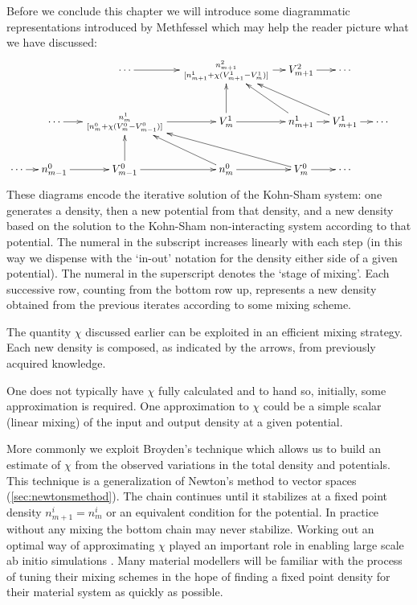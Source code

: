 Before we conclude this chapter we will introduce some diagrammatic representations introduced
by Methfessel which may help the reader picture what we have discussed\cite{methfessel95}:
%
\begin{displaymath} 
\xymatrixcolsep{4mm}
\xymatrix{
	&             &                     \cdots \ar[r]     &       n^{2}_{m+1} \atop [n^{1}_{m+1} + \chi(V^{1}_{m+1} - V^{1}_{m})] \ar[r]  & V^{2}_{m+1} \ar[r] & \cdots & &\\
	&              \cdots \ar[r] &  n^{1}_{m} \atop  [n^{0}_{m} + \chi(V^{0}_{m} - V^{0}_{m-1})] \ar[r]  & V^{1}_{m} \ar[r] \ar[u] & n^{1}_{m+1} \ar[ul] \ar[r] & V^{1}_{m+1} \ar[ull] \ar[r] & \cdots &    \\
\cdots \ar[r] & n^{0}_{m-1} \ar[r] & V^{0}_{m-1} \ar[u] \ar[r] & n^{0}_{m}\ar[ul] \ar[r] & V^{0}_{m} \ar[ull] \ar[r] & \cdots &  & \\
}
\end{displaymath}
%
These diagrams encode the iterative solution of the Kohn-Sham system: one generates a density, then
a new potential from that density, and a new density based on the solution to the Kohn-Sham non-interacting
system according to that potential. The numeral in the subscript increases linearly with each step (in this way we dispense with the
`in-out' notation for the density either side of a given potential). The numeral in the superscript 
denotes the `stage of mixing'.
Each successive row, counting from the bottom row up, represents a new density obtained from the previous iterates 
according to some mixing scheme. 

The quantity $\chi$ discussed earlier can be exploited in 
an efficient mixing strategy. Each new density is composed, as indicated by the arrows, 
from previously acquired knowledge.

One does not typically have $\chi$
fully calculated and to hand so, initially, some approximation is required.
One approximation to $\chi$ could be a simple 
scalar (linear mixing) of the input and output density at a given potential. 

More commonly we exploit Broyden's technique which allows us to build an estimate of $\chi$
from the observed variations in the total density and potentials. This technique is a generalization
of Newton's method to vector spaces (\ref{sec:newtonsmethod}).
The chain continues until it stabilizes at a fixed point density 
$n^{i}_{m+1}=n^{i}_{m}$ or an equivalent condition for the potential.
In practice without any mixing the bottom chain may never stabilize. 
Working out an optimal way of approximating $\chi$ played an important role
in enabling large scale ab initio simulations \cite{vanderbilt84, johnson88}.
Many material modellers will be familiar with the process of tuning their mixing schemes 
in the hope of finding a fixed point density for their material system as quickly as possible. 

